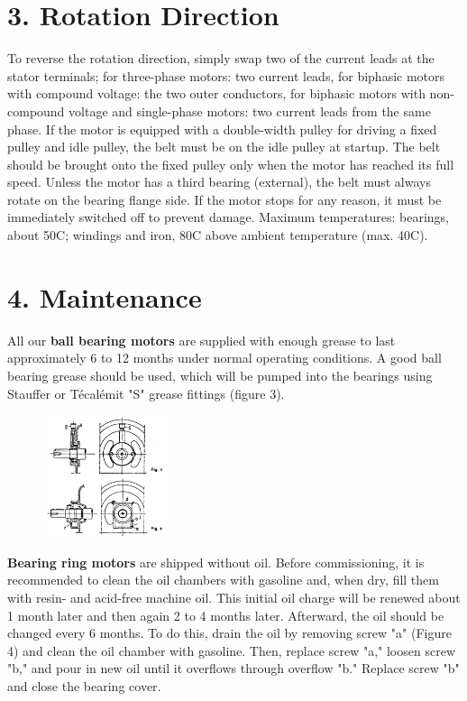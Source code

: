 {\section*{3. Rotation Direction}

To reverse the rotation direction, simply swap two of the current leads at the stator terminals;
for three-phase motors: two current leads, for biphasic motors with compound voltage: the two outer conductors,
    for biphasic motors with non-compound voltage and single-phase motors: two current leads from the same phase.
    If the motor is equipped with a double-width pulley for driving a fixed pulley and idle pulley, the belt must be on the idle pulley at startup.
The belt should be brought onto the fixed pulley only when the motor has reached its full speed.
Unless the motor has a third bearing (external), the belt must always rotate on the bearing flange side.
If the motor stops for any reason, it must be immediately switched off to prevent damage.
Maximum temperatures: bearings, about 50\textdegree C; windings and iron, 80\textdegree C above ambient temperature (max. 40\textdegree C).

\section*{4. Maintenance}

All our \textbf{ball bearing motors} are supplied with enough grease to last approximately 6 to 12 months under normal operating conditions.
A good ball bearing grease should be used, which will be pumped into the bearings using Stauffer or Técalémit "S" grease fittings (figure 3).


    \begin{figure}
        \centering
        \includegraphics[width=0.33\textwidth]{images/page_62_maintenance}
        \label{fig:alternating_motor_maintenance}
    \end{figure}

    \textbf{Bearing ring motors} are shipped without oil.
    Before commissioning, it is recommended to clean the oil chambers with gasoline and, when dry, fill them with resin- and acid-free machine oil.
This initial oil charge will be renewed about 1 month later and then again 2 to 4 months later.
Afterward, the oil should be changed every 6 months. To do this, drain the oil by removing screw "a" (Figure 4) and clean the oil chamber with gasoline. Then, replace screw "a," loosen screw "b," and pour in new oil until it overflows through overflow "b." Replace screw "b" and close the bearing cover.

}
